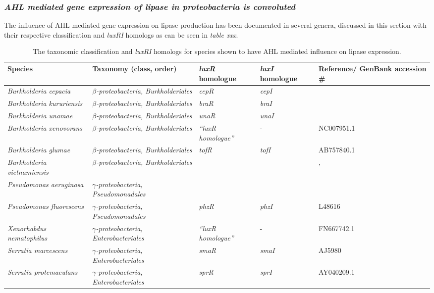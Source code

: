 \documentclass{article}
\begin{document}
\subsubsection{\emph{AHL mediated gene expression of lipase in proteobacteria is convoluted}}
The influence of AHL mediated gene expression on lipase production has been documented in several genera, discussed in this section with their respective classification and \emph{luxRI} homologs as can be seen in \emph{table xxx}.

\begin{table}
\begin{tabular}{ | p{2.5cm} | p{3cm} | p{1.5cm} | p{1.5cm} | p{2.5cm} | }
\hline
Species & Taxonomy (class, order) & \emph{luxR} homologue & \emph{luxI} homologue & Reference/ GenBank accession \# \\
\hline
\emph{Burkholderia cepacia} & \emph{$\beta$-proteobacteria, Burkholderiales} & \emph{cepR} & \emph{cepI} & \cite{lewenza1999} \\
\hline
\emph{Burkholderia kururiensis} & \emph{$\beta$-proteobacteria, Burkholderiales} & \emph{braR} & \emph{braI} & \cite{suarez2008} \\
\hline
\emph{Burkholderia unamae} & \emph{$\beta$-proteobacteria, Burkholderiales} & \emph{unaR} & \emph{unaI} & \cite{suarez2010} \\
\hline
\emph{Burkholderia xenovorans} & \emph{$\beta$-proteobacteria, Burkholderiales} & \emph{“luxR homologue”} & - & NC007951.1 \\
\hline
\emph{Burkholderia glumae} & \emph{$\beta$-proteobacteria, Burkholderiales} & \emph{tofR} & \emph{tofI} & AB757840.1 \\
\hline
\emph{Burkholderia vietnamiensis} & \emph{$\beta$-proteobacteria, Burkholderiales} & \emph{} & \emph{} & \cite{conway_02}, \cite{ulrich2004}
 \\
\hline
\emph{Pseudomonas aeruginosa} & \emph{$\gamma$-proteobacteria, Pseudomonadales} & \emph{} & \emph{} & \cite{juhas2005} \\
\hline
\emph{Pseudomonas fluorescens} & \emph{$\gamma$-proteobacteria, Pseudomonadales} & \emph{phzR} & \emph{phzI} & L48616 \\
\hline
\emph{Xenorhabdus nematophilus} & \emph{$\gamma$-proteobacteria, Enterobacteriales} & \emph{“luxR homologue”} & - & FN667742.1 \\
\hline
\emph{Serratia marcescens} & \emph{$\gamma$-proteobacteria, Enterobacteriales} & \emph{smaR} & \emph{smaI} & AJ5980 \\
\hline
\emph{Serratia protemaculans} & \emph{$\gamma$-proteobacteria, Enterobacteriales} & \emph{sprR} & \emph{sprI} & AY040209.1 \\
\hline
\end{tabular}
\caption{The taxonomic classification and \emph{luxRI} homologs for species shown to have AHL mediated influence on lipase expression.}
\end{table}
\end{document}

